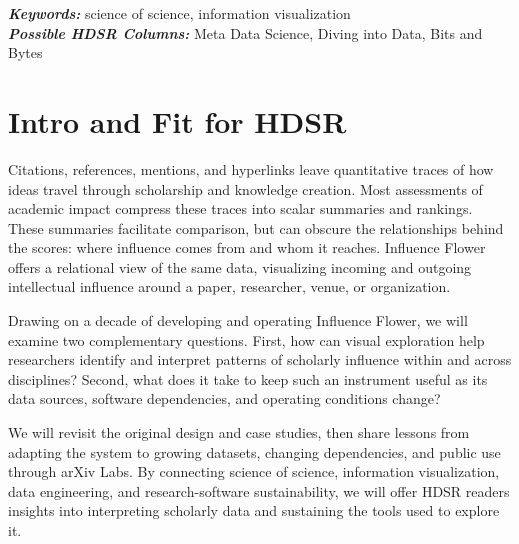 \documentclass[]{hdsr}
\begin{document}
\begin{center}


\vspace*{0.15in}
\hspace{10pt}
  \small
  \textbf{\textit{Keywords: }} {science of science, information visualization}\\
  \textbf{\textit{Possible HDSR Columns: }} {Meta Data Science, Diving into Data, Bits and Bytes}
\end{center}
\vspace*{0.15in}




\section{Intro and Fit for HDSR}

Citations, references, mentions, and hyperlinks leave quantitative traces of how ideas travel through scholarship and knowledge creation. Most assessments of academic impact compress these traces into scalar summaries and rankings. These summaries facilitate comparison, but can obscure the relationships behind the scores: where influence comes from and whom it reaches. Influence Flower offers a relational view of the same data, visualizing incoming and outgoing intellectual influence around a paper, researcher, venue, or organization.

Drawing on a decade of developing and operating Influence Flower, we will examine two complementary questions.
First, how can visual exploration help researchers identify and interpret patterns of scholarly influence within and across disciplines?
Second, what does it take to keep such an instrument useful as its data sources, software dependencies, and operating conditions change?

We will revisit the original design and case studies, then share lessons from adapting the system to growing datasets, changing dependencies, and public use through arXiv Labs. By connecting science of science, information visualization, data engineering, and research-software sustainability, we will offer HDSR readers insights into interpreting scholarly data and sustaining the tools used to explore it.
\end{document}

